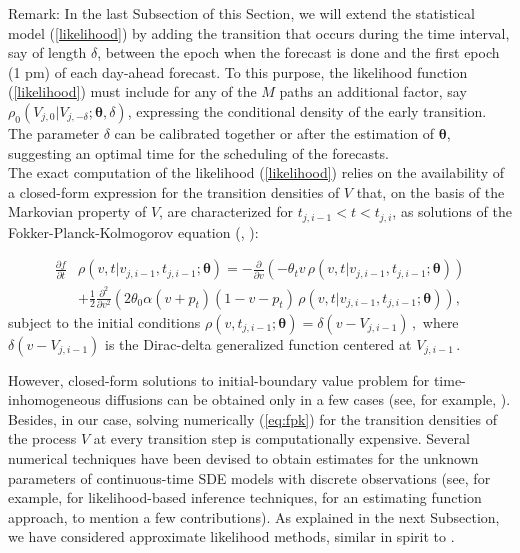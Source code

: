 \documentclass[11pt]{article}
\theoremstyle{definition}
\begin{document}
Remark: In the last Subsection of this Section, we will extend the statistical model (\ref{likelihood}) by adding the transition that occurs during the time interval, say of length $\delta$, between the epoch when the forecast is done and the first epoch (1 pm) of each day-ahead forecast. 
To this purpose, the likelihood function (\ref{likelihood}) must include for any of the $M$ paths an additional factor, say $\rho_0 (V_{j, 0}|V_{j, -\delta};\bm{\theta},\delta)$, expressing the conditional density of the early transition. The parameter $\delta$ can be calibrated together or after the estimation of $\bm{\theta}$, suggesting an optimal time for the scheduling of the forecasts.\\
 
The exact computation of the likelihood (\ref{likelihood}) relies on the availability of a closed-form expression for the transition densities of $V$ that, on the basis of the Markovian property of $V$, are characterized for $ t_{j, i-1} < t < t_{j,i}$,  as solutions of the Fokker-Planck-Kolmogorov equation (\cite[36]{iacus1}, \cite[61-68]{saso}):

\begin{align}
\frac{ \partial f }{\partial t } & \rho(v ,t \vert v_{j,i-1} ,  t_{j,i-1} ; \bm{\theta} )= - \frac{\partial}{ \partial v} (- \theta_t v \, \rho(v ,t \vert v_{j,i-1} ,  t_{j,i-1} ; \bm{\theta} ) ) \nonumber \\
& + \frac{1}{2} \frac{\partial^2}{ \partial v^2} ( 2 \theta_0 \alpha (v+ p_t) (1 - v- p_t) \, \rho(v ,t \vert v_{j,i-1} ,  t_{j,i-1} ; \bm{\theta} ) ),  \label{eq:fpk}
\end{align}
subject to the initial conditions $\rho(v , t_{j, i-1} ; \bm{\theta} ) = \delta(v - V_{j, i-1}) \,,$ where $ \delta(v - V_{j, i-1})$ is the Dirac-delta generalized function centered at $ V_{j, i-1}\,.$

However, closed-form solutions to initial-boundary value problem for time-inhomogeneous diffusions can be obtained only in a few cases (see, for example, \autocite[Section 3.1]{eglix}). Besides, in our case, solving numerically (\ref{eq:fpk}) for the transition densities of the process $V$ at every transition step is computationally expensive. 
Several numerical techniques have been devised to obtain estimates for the unknown parameters of continuous-time SDE models with discrete observations (see, for example, \cite{prewo} for likelihood-based inference techniques, \cite{Sor} for an estimating function approach, to mention a few contributions). As explained in the next Subsection, we have considered approximate likelihood methods, similar in spirit to \autocite[Section 11.4]{saso}.
\end{document}
